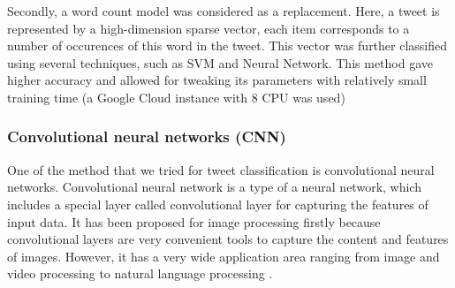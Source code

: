\documentclass[10pt,conference,compsocconf]{IEEEtran}
\begin{document}
Secondly, a word count model was considered as a replacement.
Here, a tweet is represented by a high-dimension sparse vector, each item corresponds to a number of occurences of this word in the tweet.
This vector was further classified using several techniques, such as SVM and Neural Network.
This method gave higher accuracy and allowed for tweaking its parameters with relatively small training time (a Google Cloud instance with 8 CPU was used)
\vspace{5mm} %
\subsubsection{Convolutional neural networks (CNN)}


One of the method that we tried for tweet classification is convolutional neural networks. Convolutional neural network is a type of a neural network, which includes a special layer called convolutional layer for capturing the features of input data. It has been proposed for image processing firstly because convolutional layers are very convenient tools to capture the content and features of images. However, it has a very wide application area ranging from image and video processing to natural language processing \cite{cnn1}.
\end{document}
